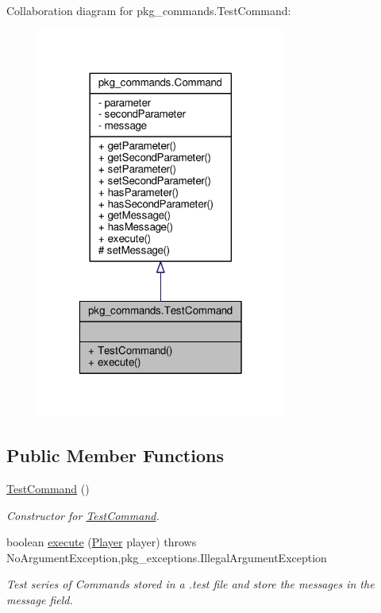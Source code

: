 Collaboration diagram for pkg\-\_\-commands.\-Test\-Command\-:
\nopagebreak
\begin{figure}[H]
\begin{center}
\leavevmode
\includegraphics[width=232pt]{classpkg__commands_1_1TestCommand__coll__graph}
\end{center}
\end{figure}
\subsection*{Public Member Functions}
\begin{DoxyCompactItemize}
\item 
\hyperlink{classpkg__commands_1_1TestCommand_a116f412bc5f67f0c344e436d33126f25}{Test\-Command} ()
\begin{DoxyCompactList}\small\item\em Constructor for \hyperlink{classpkg__commands_1_1TestCommand}{Test\-Command}. \end{DoxyCompactList}\item 
boolean \hyperlink{classpkg__commands_1_1TestCommand_a1ff07c27a46910d20c2e4569888892ca}{execute} (\hyperlink{classpkg__world_1_1Player}{Player} player)  throws No\-Argument\-Exception,pkg\-\_\-exceptions.\-Illegal\-Argument\-Exception 
\begin{DoxyCompactList}\small\item\em Test series of Commands stored in a .test file and store the messages in the message field. \end{DoxyCompactList}\end{DoxyCompactItemize}
